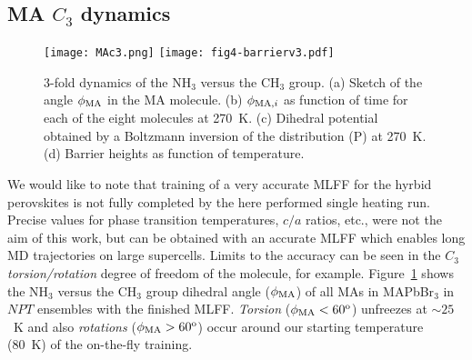 \documentclass[journal=jpccck,manuscript=article,layout=twocolumn]{achemso}
\begin{document}
\subsection{MA $C_3$ dynamics}
\begin{figure}[!b]
    \begin{center}

    \texttt{[image: MAc3.png]}
   \texttt{[image: fig4-barrierv3.pdf]}
    
    \end{center}
   \caption{3-fold dynamics of the NH$_3$ versus the CH$_3$ group. (a) Sketch of the angle $\phi_{\rm MA}$ in the MA molecule. (b) $\phi_{{\rm MA},i}$ as function of time for each of the eight molecules at 270~K. (c) Dihedral potential obtained by a Boltzmann inversion of the distribution (P) at 270~K. (d) Barrier heights as function of temperature. }
\label{fig:6}
\end{figure}

We would like to note that training of a very accurate MLFF for the hyrbid perovskites is not fully completed by the here performed single heating run. Precise values for phase transition temperatures, $c/a$ ratios, etc., were not the aim of this work, but can be obtained with an accurate MLFF which enables long MD trajectories on large supercells\cite{Jinnouchi:prl19}. Limits to the accuracy can be seen in the $C_3$ \textit{torsion/rotation} degree of freedom of the molecule, for example. Figure~\ref{fig:6} shows the NH$_3$ versus the CH$_3$ group dihedral angle ($\phi_{\rm MA}$) of all MAs in MAPbBr$_3$ in $NPT$ ensembles with the finished MLFF. \textit{Torsion} ($\phi_{\rm MA}< 60^{\rm o}$) unfreezes at $\sim25$~K\cite{Sharma:jpcl20} and also \textit{rotations} ($\phi_{\rm MA}> 60^{\rm o}$) occur around our starting temperature (80~K) of the on-the-fly training.
\end{document}
